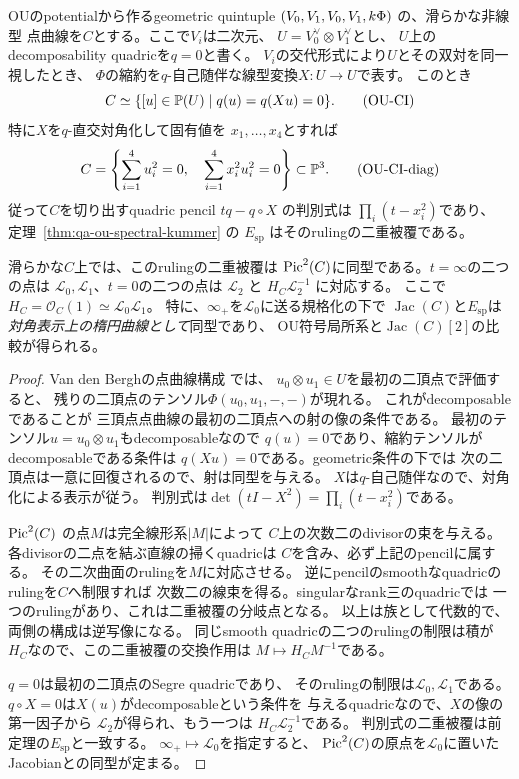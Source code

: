 \begin{proposition}
\label{prop:qa-ou-pointcurve-quadric-pencil}
OUのpotentialから作るgeometric quintuple
$(V_0,V_1,V_0,V_1,k\Phi)$ の、滑らかな非線型
点曲線を$C$とする。ここで$V_i$は二次元、
$U=V_0^\vee\otimes V_1^\vee$とし、
$U$上のdecomposability quadricを$q=0$と書く。
$V_i$の交代形式により$U$とその双対を同一視したとき、
$\Phi$の縮約を$q$-自己随伴な線型変換$X:U\to U$で表す。
このとき
\[
 C\simeq\{[u]\in\mathbb P(U)\mid q(u)=q(Xu)=0\}.
 \tag{OU-CI}\label{eq:qa-ou-pointcurve-two-quadrics}
\]
特に$X$を$q$-直交対角化して固有値を
$x_1,\ldots,x_4$とすれば
\[
 C=\left\{\sum_{i=1}^4u_i^2=0,\quad
               \sum_{i=1}^4x_i^2u_i^2=0\right\}
 \subset\mathbb P^3.
 \tag{OU-CI-diag}\label{eq:qa-ou-pointcurve-diagonal}
\]
従って$C$を切り出すquadric pencil
$tq-q\circ X$ の判別式は
$\prod_i(t-x_i^2)$であり、
定理~\ref{thm:qa-ou-spectral-kummer} の
$E_{\mathrm{sp}}$ はそのrulingの二重被覆である。

滑らかな$C$上では、このrulingの二重被覆は
$\operatorname{Pic}^2(C)$に同型である。$t=\infty$の二つの点は
$\mathcal L_0,\mathcal L_1$、$t=0$の二つの点は
$\mathcal L_2$ と
$H_C\mathcal L_2^{-1}$ に対応する。
ここで$H_C=\mathcal O_C(1)\simeq\mathcal L_0\mathcal L_1$。
特に、$\infty_+$を$\mathcal L_0$に送る規格化の下で
$\operatorname{Jac}(C)$と$E_{\mathrm{sp}}$は
\emph{対角表示上の楕円曲線として}同型であり、
OU符号局所系と$\operatorname{Jac}(C)[2]$の比較が得られる。
\end{proposition}
\begin{proof}
Van den Berghの点曲線構成
\cite[\S2, (2.19), (2.21)--(2.28)]{OU2014} では、
$u_0\otimes u_1\in U$を最初の二頂点で評価すると、
残りの二頂点のテンソル$\Phi(u_0,u_1,-,-)$が現れる。
これがdecomposableであることが
三頂点点曲線の最初の二頂点への射の像の条件である。
最初のテンソル$u=u_0\otimes u_1$もdecomposableなので
$q(u)=0$であり、縮約テンソルがdecomposableである条件は
$q(Xu)=0$である。geometric条件の下では
次の二頂点は一意に回復されるので、射は同型を与える。
$X$は$q$-自己随伴なので、対角化による表示が従う。
判別式は$\det(tI-X^2)=\prod_i(t-x_i^2)$である。

$\operatorname{Pic}^2(C)$ の点$M$は完全線形系$|M|$によって
$C$上の次数二のdivisorの束を与える。
各divisorの二点を結ぶ直線の掃くquadricは
$C$を含み、必ず上記のpencilに属する。
その二次曲面のrulingを$M$に対応させる。
逆にpencilのsmoothなquadricのrulingを$C$へ制限すれば
次数二の線束を得る。singularなrank三のquadricでは
一つのrulingがあり、これは二重被覆の分岐点となる。
以上は族として代数的で、両側の構成は逆写像になる。
同じsmooth quadricの二つのrulingの制限は積が
$H_C$なので、この二重被覆の交換作用は
$M\mapsto H_CM^{-1}$である。

$q=0$は最初の二頂点のSegre quadricであり、
そのrulingの制限は$\mathcal L_0,\mathcal L_1$である。
$q\circ X=0$は$X(u)$がdecomposableという条件を
与えるquadricなので、$X$の像の第一因子から
$\mathcal L_2$が得られ、もう一つは
$H_C\mathcal L_2^{-1}$である。
判別式の二重被覆は前定理の$E_{\mathrm{sp}}$と一致する。
$\infty_+\mapsto\mathcal L_0$を指定すると、
$\operatorname{Pic}^2(C)$の原点を$\mathcal L_0$に置いた
Jacobianとの同型が定まる。
\end{proof}

